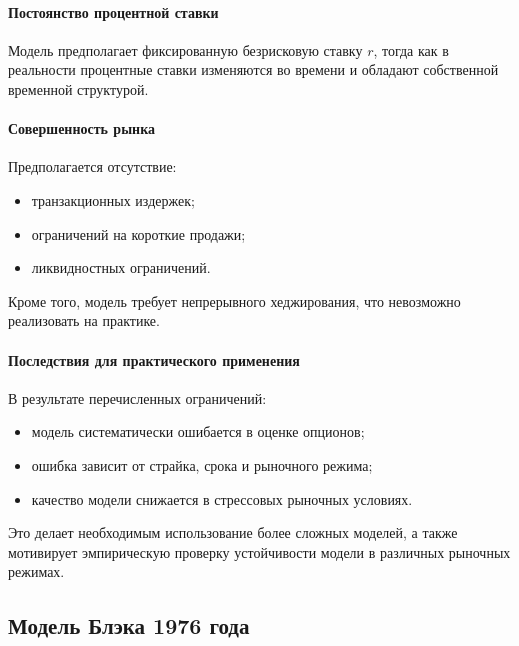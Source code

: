 \documentclass[11pt,a4paper]{article}
\begin{document}
\paragraph{Постоянство процентной ставки}

Модель предполагает фиксированную безрисковую ставку $r$, тогда как в реальности процентные ставки изменяются во времени и обладают собственной временной структурой.

\paragraph{Совершенность рынка}

Предполагается отсутствие:

\begin{itemize}
    \item транзакционных издержек;
    
    \item ограничений на короткие продажи;
    
    \item ликвидностных ограничений.
\end{itemize}

Кроме того, модель требует непрерывного хеджирования, что невозможно реализовать на практике.

\paragraph{Последствия для практического применения}

В результате перечисленных ограничений:

\begin{itemize}
    \item модель систематически ошибается в оценке опционов;
    
    \item ошибка зависит от страйка, срока и рыночного режима;
    
    \item качество модели снижается в стрессовых рыночных условиях.
\end{itemize}

Это делает необходимым использование более сложных моделей, а также мотивирует эмпирическую проверку устойчивости модели в различных рыночных режимах.





\subsection{Модель Блэка 1976 года}
\end{document}
